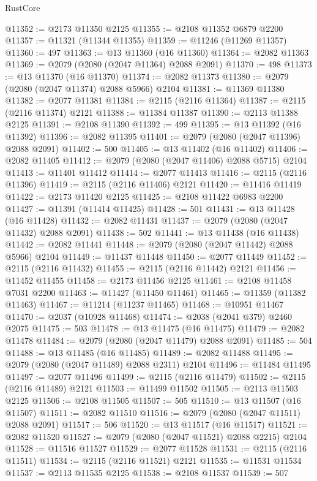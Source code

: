 \begin{lexlean}{RustCore}
\begin{coremodule}
@11352 := @2173 @11350 @2125
@11355 := @2108 @11352 @6879 @2200
@11357 := @11321 (@11344 @11355)
@11359 := @11246 (@11269 @11357)
@11360 := 497
@11363 := @13 @11360 (@16 @11360)
@11364 := @2082 @11363
@11369 := @2079 (@2080 (@2047 @11364) @2088 @2091)
@11370 := 498
@11373 := @13 @11370 (@16 @11370)
@11374 := @2082 @11373
@11380 := @2079 (@2080 (@2047 @11374) @2088 @5966) @2104
@11381 := @11369 @11380
@11382 := @2077 @11381
@11384 := @2115 (@2116 @11364)
@11387 := @2115 (@2116 @11374) @2121
@11388 := @11384 @11387
@11390 := @2113 @11388 @2125
@11391 := @2108 @11390
@11392 := 499
@11395 := @13 @11392 (@16 @11392)
@11396 := @2082 @11395
@11401 := @2079 (@2080 (@2047 @11396) @2088 @2091)
@11402 := 500
@11405 := @13 @11402 (@16 @11402)
@11406 := @2082 @11405
@11412 := @2079 (@2080 (@2047 @11406) @2088 @5715) @2104
@11413 := @11401 @11412
@11414 := @2077 @11413
@11416 := @2115 (@2116 @11396)
@11419 := @2115 (@2116 @11406) @2121
@11420 := @11416 @11419
@11422 := @2173 @11420 @2125
@11425 := @2108 @11422 @6983 @2200
@11427 := @11391 (@11414 @11425)
@11428 := 501
@11431 := @13 @11428 (@16 @11428)
@11432 := @2082 @11431
@11437 := @2079 (@2080 (@2047 @11432) @2088 @2091)
@11438 := 502
@11441 := @13 @11438 (@16 @11438)
@11442 := @2082 @11441
@11448 := @2079 (@2080 (@2047 @11442) @2088 @5966) @2104
@11449 := @11437 @11448
@11450 := @2077 @11449
@11452 := @2115 (@2116 @11432)
@11455 := @2115 (@2116 @11442) @2121
@11456 := @11452 @11455
@11458 := @2173 @11456 @2125
@11461 := @2108 @11458 @7031 @2200
@11463 := @11427 (@11450 @11461)
@11465 := @11359 (@11382 @11463)
@11467 := @11214 (@11237 @11465)
@11468 := @10951 @11467
@11470 := @2037 (@10928 @11468)
@11474 := @2038 (@2041 @379) @2460 @2075
@11475 := 503
@11478 := @13 @11475 (@16 @11475)
@11479 := @2082 @11478
@11484 := @2079 (@2080 (@2047 @11479) @2088 @2091)
@11485 := 504
@11488 := @13 @11485 (@16 @11485)
@11489 := @2082 @11488
@11495 := @2079 (@2080 (@2047 @11489) @2088 @2311) @2104
@11496 := @11484 @11495
@11497 := @2077 @11496
@11499 := @2115 (@2116 @11479)
@11502 := @2115 (@2116 @11489) @2121
@11503 := @11499 @11502
@11505 := @2113 @11503 @2125
@11506 := @2108 @11505
@11507 := 505
@11510 := @13 @11507 (@16 @11507)
@11511 := @2082 @11510
@11516 := @2079 (@2080 (@2047 @11511) @2088 @2091)
@11517 := 506
@11520 := @13 @11517 (@16 @11517)
@11521 := @2082 @11520
@11527 := @2079 (@2080 (@2047 @11521) @2088 @2215) @2104
@11528 := @11516 @11527
@11529 := @2077 @11528
@11531 := @2115 (@2116 @11511)
@11534 := @2115 (@2116 @11521) @2121
@11535 := @11531 @11534
@11537 := @2113 @11535 @2125
@11538 := @2108 @11537
@11539 := 507

\end{coremodule}
\end{lexlean}
